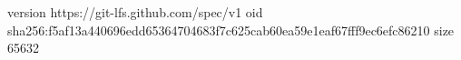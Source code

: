 version https://git-lfs.github.com/spec/v1
oid sha256:f5af13a440696edd65364704683f7c625cab60ea59e1eaf67fff9ec6efc86210
size 65632
